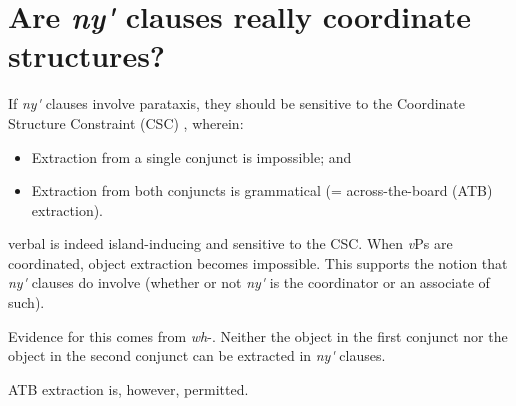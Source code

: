 \documentclass[output=paper,modfonts,nonflat,
colorlinks, citecolor=brown,
draftmode
]{langsci/langscibook}
\begin{document}
\section{Are \textit{ny\'{\textturnv}\ng} clauses really coordinate structures?}\label{sec:duncan-et-al:4}

If  \textit{ny\'{\textturnv}\ng} clauses involve parataxis, they should be sensitive to the Coordinate Structure Constraint (CSC) \citep{ross1967constraints}, wherein:

\begin{itemize}
\item Extraction from a single conjunct is impossible; and
\item Extraction from both conjuncts is grammatical (= across-the-board (ATB) extraction).
\end{itemize}

\noindent {} verbal  is indeed island-inducing and sensitive to the CSC. When \textit{v}Ps are coordinated, object extraction becomes impossible. This supports the notion that \textit{ny\'{\textturnv}\ng} clauses do involve  (whether or not \textit{ny\'{\textturnv}\ng} is the coordinator or an associate of such).

Evidence for this comes from \textit{wh}-. Neither the object in the first conjunct nor the object in the second conjunct can be extracted in \textit{ny\'{\textturnv}\ng} clauses.

\ea\label{ex:duncan-et-al:13}
\z
\z

\noindent ATB extraction is, however, permitted.
\end{document}
